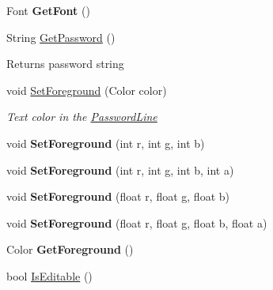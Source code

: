 \begin{DoxyCompactItemize}
Font {\bfseries Get\+Font} ()
\item 
\mbox{\label{class_space_v_i_l_1_1_password_line_acf665674b31eb9743a05f4a22c2ed055}} 
String \mbox{\hyperlink{class_space_v_i_l_1_1_password_line_acf665674b31eb9743a05f4a22c2ed055}{Get\+Password}} ()
\begin{DoxyCompactList}\small\item\em \begin{DoxyReturn}{Returns}
password string 
\end{DoxyReturn}
\end{DoxyCompactList}\item 
void \mbox{\hyperlink{class_space_v_i_l_1_1_password_line_a9ca1d5dc8f4f3f3036f8a8098930b350}{Set\+Foreground}} (Color color)
\begin{DoxyCompactList}\small\item\em Text color in the \mbox{\hyperlink{class_space_v_i_l_1_1_password_line}{Password\+Line}} \end{DoxyCompactList}\item 
\mbox{\label{class_space_v_i_l_1_1_password_line_a8453eb5f5c85540e9656b4e2ca05b97d}} 
void {\bfseries Set\+Foreground} (int r, int g, int b)
\item 
\mbox{\label{class_space_v_i_l_1_1_password_line_a1e36928fa9e8d1b0c9f50a8a24919f0a}} 
void {\bfseries Set\+Foreground} (int r, int g, int b, int a)
\item 
\mbox{\label{class_space_v_i_l_1_1_password_line_ad05d4f1f57674c394080f28bf0f16183}} 
void {\bfseries Set\+Foreground} (float r, float g, float b)
\item 
\mbox{\label{class_space_v_i_l_1_1_password_line_a0a328277276d9f309e8499372f2d898d}} 
void {\bfseries Set\+Foreground} (float r, float g, float b, float a)
\item 
\mbox{\label{class_space_v_i_l_1_1_password_line_ab1ef605f2bf3a49e7ac03a24d7c1cccd}} 
Color {\bfseries Get\+Foreground} ()
\item 
bool \mbox{\hyperlink{class_space_v_i_l_1_1_password_line_a1defdc8c76e67ca62653ce1c06277e88}{Is\+Editable}} ()

\end{DoxyCompactItemize}
